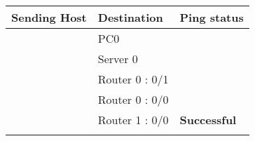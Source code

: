 \documentclass[a4paper,11pt]{article}
\begin{document}
\begin{enumerate}
\begin{enumerate}


                    \begin{table}[H]
                        \centering
                        \begin{tabular}{| m{9em}| m{12em}| m{9em} |}
                            \hline
                            {\cellcolor[rgb]{0.333,0.686,1}}\textbf{Sending Host}                & \textbf{Destination} & \textbf{Ping status}                                                  \\
                            \hline
                            {\cellcolor[rgb]{0.333,0.686,1}}                                     & PC0                  & {\cellcolor[rgb]{0.376,1,0.882}}                                      \\
                            \hhline{|>{\arrayrulecolor[rgb]{0.333,0.686,1}}->{\arrayrulecolor{black}}->{\arrayrulecolor[rgb]{0.376,1,0.882}}->{\arrayrulecolor{black}}|}
                            {\cellcolor[rgb]{0.333,0.686,1}}                                     & Server 0             & {\cellcolor[rgb]{0.376,1,0.882}}                                      \\
                            \hhline{|>{\arrayrulecolor[rgb]{0.333,0.686,1}}->{\arrayrulecolor{black}}->{\arrayrulecolor[rgb]{0.376,1,0.882}}->{\arrayrulecolor{black}}|}
                            {\cellcolor[rgb]{0.333,0.686,1}}                                     & Router 0 : 0/1       & {\cellcolor[rgb]{0.376,1,0.882}}                                      \\
                            \hhline{|>{\arrayrulecolor[rgb]{0.333,0.686,1}}->{\arrayrulecolor{black}}->{\arrayrulecolor[rgb]{0.376,1,0.882}}->{\arrayrulecolor{black}}|}
                            {\cellcolor[rgb]{0.333,0.686,1}}                                     & Router 0 : 0/0       & {\cellcolor[rgb]{0.376,1,0.882}}                                      \\
                            \hhline{|>{\arrayrulecolor[rgb]{0.333,0.686,1}}->{\arrayrulecolor{black}}->{\arrayrulecolor[rgb]{0.376,1,0.882}}->{\arrayrulecolor{black}}|}
                            {\cellcolor[rgb]{0.333,0.686,1}}                                     & Router 1 : 0/0       & \multirow{-5}{*}{{\cellcolor[rgb]{0.376,1,0.882}}\textbf{Successful}} \\
                            \hhline{|>{\arrayrulecolor[rgb]{0.333,0.686,1}}->{\arrayrulecolor{black}}--|}

\end{tabular}
\end{table}
\end{enumerate}
\end{enumerate}
\end{document}

